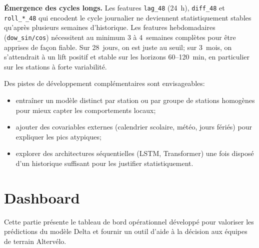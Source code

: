 \documentclass[fleqn, 12pt]{scrartcl}
\newcommand{\ent}{Altervélo}
\begin{document}
\vspace{0.3cm}

\textbf{Émergence des cycles longs.} Les features \texttt{lag\_48} (24~h), \texttt{diff\_48} et \texttt{roll\_*\_48} qui encodent le cycle journalier ne deviennent statistiquement stables qu'après plusieurs semaines d'historique. Les features hebdomadaires (\texttt{dow\_sin/cos}) nécessitent au minimum 3 à 4~semaines complètes pour être apprises de façon fiable. Sur 28~jours, on est juste au seuil; sur 3~mois, on s'attendrait à un lift positif et stable sur les horizons 60--120~min, en particulier sur les stations à forte variabilité.

\vspace{0.3cm}

Des pistes de développement complémentaires sont envisageables:
\begin{itemize}
    \item entraîner un modèle distinct par station ou par groupe de stations homogènes pour mieux capter les comportements locaux;
    \item ajouter des covariables externes (calendrier scolaire, météo, jours fériés) pour expliquer les pics atypiques;
    \item explorer des architectures séquentielles (LSTM, Transformer) une fois disposé d'un historique suffisant pour les justifier statistiquement.
\end{itemize}


\newpage

\section{Dashboard}%
\label{sec:dashboard}

Cette partie présente le tableau de bord opérationnel développé pour valoriser les prédictions du modèle Delta et fournir un outil d'aide à la décision aux équipes de terrain \ent.
\end{document}
